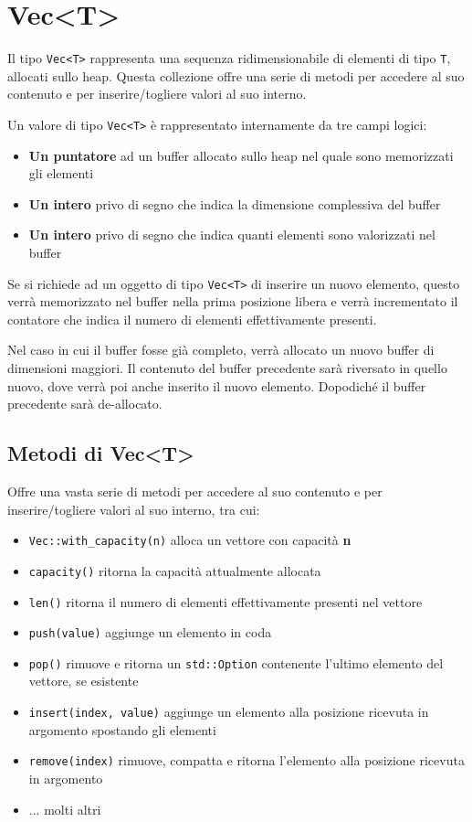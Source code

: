 \section{Vec<T>}
Il tipo \texttt{Vec<T>} rappresenta una sequenza ridimensionabile di elementi di
tipo \texttt{T}, allocati sullo heap. Questa collezione offre una serie di
metodi per accedere al suo contenuto e per inserire/togliere valori al suo
interno.

Un valore di tipo \texttt{Vec<T>} è rappresentato internamente da tre campi logici:


\begin{itemize}
  \item \textbf{Un puntatore} ad un buffer allocato sullo
        heap nel quale sono memorizzati gli elementi
  \item \textbf{Un intero} privo di segno che indica la dimensione complessiva del buffer
  \item \textbf{Un intero} privo di segno che indica quanti elementi sono valorizzati nel buffer
\end{itemize}


Se si richiede ad un oggetto di tipo \texttt{Vec<T>} di inserire un nuovo
elemento, questo verrà memorizzato nel buffer nella prima posizione libera e
verrà incrementato il contatore che indica il numero di elementi effettivamente
presenti.

Nel caso in cui il buffer fosse già completo, verrà allocato un nuovo buffer di
dimensioni maggiori. Il contenuto del buffer precedente sarà riversato in
quello nuovo, dove verrà poi anche inserito il nuovo elemento. Dopodiché il
buffer precedente sarà de-allocato.

\subsection{Metodi di Vec<T>}
Offre una vasta serie di metodi per accedere al suo contenuto e per
inserire/togliere valori al suo interno, tra cui:


\begin{itemize}
  \item \texttt{Vec::with\_capacity(n)} alloca un vettore con capacità \textbf{n}
  \item \texttt{capacity()} ritorna la capacità attualmente allocata
  \item \texttt{len()} ritorna il numero di elementi effettivamente presenti
        nel vettore
  \item \texttt{push(value)} aggiunge un elemento in coda
  \item \texttt{pop()} rimuove e ritorna un \texttt{std::Option} contenente l'ultimo
        elemento del vettore, se esistente
  \item \texttt{insert(index, value)} aggiunge un elemento alla posizione ricevuta in argomento spostando gli elementi
  \item \texttt{remove(index)} rimuove, compatta e ritorna l'elemento alla posizione ricevuta in argomento
  \item ... molti altri
\end{itemize}


